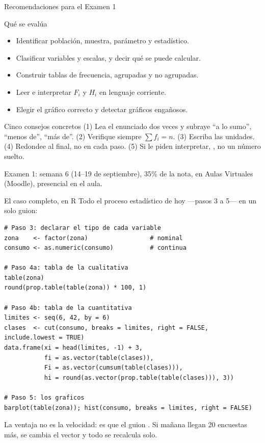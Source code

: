 \documentclass[aspectratio=169,10pt]{beamer}
\begin{document}
\begin{frame}{Recomendaciones para el Examen 1}
  \begin{block}{Qué se evalúa}
    \scriptsize
    \begin{itemize}\setlength{\itemsep}{0.02cm}
      \item Identificar población, muestra, parámetro y estadístico.
      \item Clasificar variables y escalas, y decir qué se puede calcular.
      \item Construir tablas de frecuencia, agrupadas y no agrupadas.
      \item Leer e interpretar $F_i$ y $H_i$ en lenguaje corriente.
      \item Elegir el gráfico correcto y detectar gráficos engañosos.
    \end{itemize}
  \end{block}

  \vspace{0.1cm}
  \begin{alertblock}{Cinco consejos concretos}
    \scriptsize
    (1) Lea el enunciado dos veces y subraye ``a lo sumo'', ``menos de'',
    ``más de''. \quad (2) Verifique siempre $\sum f_i = n$. \quad
    (3) Escriba las unidades. \quad (4) Redondee al final, no en cada paso.
    \quad (5) Si le piden interpretar, ,
    no un número suelto.
  \end{alertblock}

  \vspace{0.05cm}
  {\tiny\color{uniGris} Examen 1: semana 6 (14--19 de septiembre), 35\% de la
  nota, en Aulas Virtuales (Moodle), presencial en el aula.}
\end{frame}

\begin{frame}[fragile]{El caso completo, en R}
  \scriptsize
  Todo el proceso estadístico de hoy —pasos 3 a 5— en un solo guion:
\begin{lstlisting}[style=Rmini]
# Paso 3: declarar el tipo de cada variable
zona    <- factor(zona)                 # nominal
consumo <- as.numeric(consumo)          # continua

# Paso 4a: tabla de la cualitativa
table(zona)
round(prop.table(table(zona)) * 100, 1)

# Paso 4b: tabla de la cuantitativa
limites <- seq(6, 42, by = 6)
clases  <- cut(consumo, breaks = limites, right = FALSE, include.lowest = TRUE)
data.frame(xi = head(limites, -1) + 3,
           fi = as.vector(table(clases)),
           Fi = as.vector(cumsum(table(clases))),
           hi = round(as.vector(prop.table(table(clases))), 3))

# Paso 5: los graficos
barplot(table(zona)); hist(consumo, breaks = limites, right = FALSE)
\end{lstlisting}

  \vspace{-0.1cm}
  {\tiny\color{uniGris} La ventaja no es la velocidad: es que el guion
  . Si mañana llegan 20 encuestas más, se cambia el
  vector y todo se recalcula solo.}
\end{frame}
\end{document}
